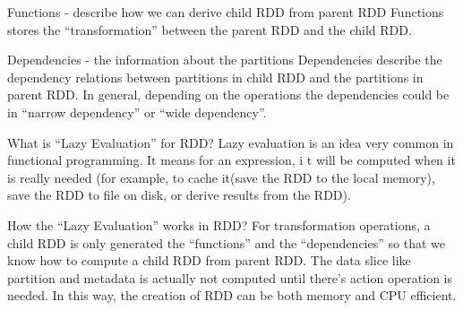 \documentclass[notheorems, aspectratio=54]{beamer}
\begin{document}

\begin{frame}

\begin{block}{Functions - describe how we can derive child RDD from parent RDD}
 Functions stores the ``transformation'' between the parent RDD and the child RDD. 
\end{block}

\begin{block}{Dependencies - the information about the partitions}
 Dependencies describe the dependency relations between partitions in child RDD and the partitions in parent RDD. 
 In general, depending on the operations the dependencies could be in ``narrow dependency'' or ``wide dependency''.
\end{block}

\end{frame}


\begin{frame}

\begin{block}{What is ``Lazy Evaluation'' for RDD?}
 Lazy evaluation is an idea very common in functional programming. It means for an expression, i
 t will be computed when it is really needed (for example, to cache it(save the RDD to the local memory), 
 save the RDD to file on disk, or derive results from the RDD). 
\end{block}

\begin{block}{How the ``Lazy Evaluation'' works in RDD?}
For transformation operations, a child RDD is only generated the ``functions'' and the ``dependencies'' 
so that we know how to compute a child RDD from parent RDD. 
The data slice like partition and metadata is actually not computed until there's 
action operation is needed. In this way, the creation of RDD can be both memory and  CPU efficient.
\end{block}


\end{frame}

\end{document}
